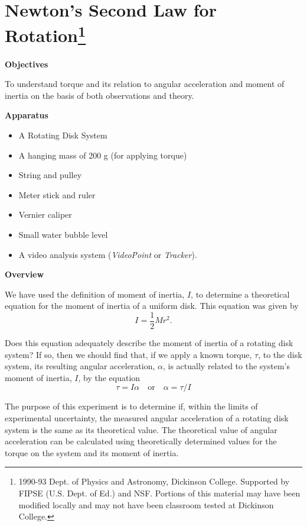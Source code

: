 
\section{Newton's Second Law for Rotation\footnote{
1990-93 Dept. of Physics and Astronomy, Dickinson College. Supported by FIPSE
(U.S. Dept. of Ed.) and NSF. Portions of this material may have been modified
locally and may not have been classroom tested at Dickinson College.
}}

\makelabheader %

\textbf{Objectives} 

To understand torque and its relation to angular acceleration and moment of
inertia on the basis of both observations and theory. 

\textbf{Apparatus}

\begin{itemize}
\item A Rotating Disk System 
\item A hanging mass of 200 g (for applying torque) 
\item String and pulley
\item Meter stick and ruler
\item Vernier caliper
\item Small water bubble level
\item A video analysis system (\textit{VideoPoint} or \textit{Tracker}).
\end{itemize}
\textbf{Overview} 

We have used the definition of moment of inertia, $I$, to determine a theoretical equation for the moment of inertia of a uniform disk. This equation was given by
\[
I=\frac{1}{2}Mr^{2}.\]


Does this equation adequately describe the moment of inertia of a rotating
disk system? If so, then we should find that, if we apply a known torque, \( \tau  \), to the disk system, its resulting angular acceleration, \( \alpha  \), is actually related to the system's moment of inertia, $I$, by the equation
\[
\tau =I\alpha \quad \mbox{or}\quad \alpha =\tau /I\]


The purpose of this experiment is to determine if, within the limits of experimental
uncertainty, the measured angular acceleration of a rotating disk system is
the same as its theoretical value. The theoretical value of angular acceleration can be calculated using theoretically determined values for the torque on the
system and its moment of inertia.

